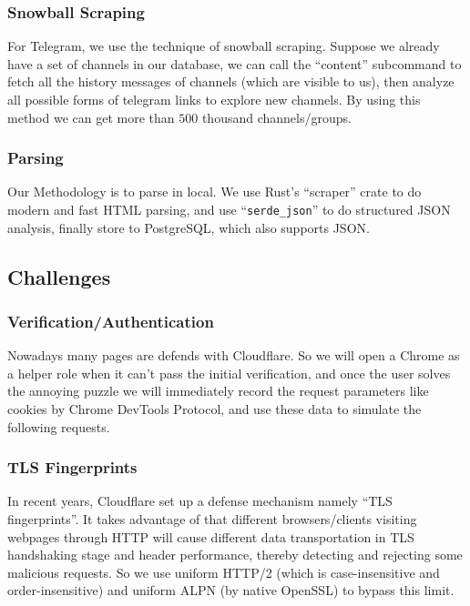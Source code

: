 \documentclass{article}
\begin{document}
	\subsubsection{Snowball Scraping}

	For Telegram, we use the technique of snowball scraping. Suppose we already have a set of channels in our database, we can call the ``content'' subcommand to fetch all the history messages of channels (which are visible to us), then analyze all possible forms of telegram links to explore new channels. By using this method we can get more than $500$ thousand channels/groups.

	\subsubsection{Parsing}

	Our Methodology is to parse in local. We use Rust's ``scraper'' crate to do modern and fast HTML parsing, and use ``\verb!serde_json!'' to do structured JSON analysis, finally store to PostgreSQL, which also supports JSON.

	\subsection{Challenges}

	\subsubsection{Verification/Authentication}

	Nowadays many pages are defends with Cloudflare. So we will open a Chrome as a helper role when it can't pass the initial verification, and once the user solves the annoying puzzle we will immediately record the request parameters like cookies by Chrome DevTools Protocol, and use these data to simulate the following requests.

	\subsubsection{TLS Fingerprints}

	In recent years, Cloudflare set up a defense mechanism namely ``TLS fingerprints''\cite{tls-fingerprint}. It takes advantage of that different browsers/clients visiting webpages through HTTP will cause different data transportation in TLS handshaking stage and header performance, thereby detecting and rejecting some malicious requests. So we use uniform HTTP/2 (which is case-insensitive and order-insensitive) and uniform ALPN (by native OpenSSL) to bypass this limit.
\end{document}
